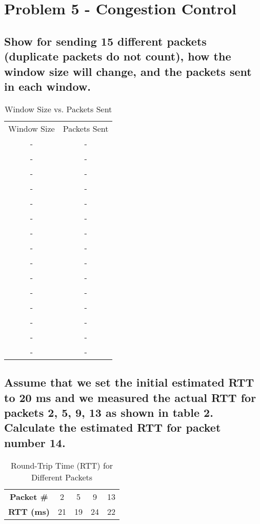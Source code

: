 \documentclass{article}
\begin{document}
\section{Problem 5 - Congestion Control}

\subsection{Show for sending 15 different packets (duplicate packets do not count), how the
window size will change, and the packets sent in each window.}

	\begin{table}[h]
		\centering
		\begin{tabular}{cc}
			Window Size & Packets Sent \\
			- & - \\
			- & - \\
			- & - \\
			- & - \\
			- & - \\
			- & - \\
			- & - \\
			- & - \\
			- & - \\
			- & - \\
			- & - \\
			- & - \\
			- & - \\
			- & - \\
			- & - \\
		\end{tabular}
		\caption{Window Size vs. Packets Sent}
		\label{tab:window_packets}
	\end{table}

\subsection{Assume that we set the initial estimated RTT to 20 ms and we measured the
actual RTT for packets 2, 5, 9, 13 as shown in table 2. Calculate the estimated RTT for
packet number 14.}

\begin{table}[h]
    \centering
    \begin{tabular}{ccccc}
        \textbf{Packet \#} & 2  & 5  & 9  & 13 \\
        \textbf{RTT (ms)}  & 21 & 19 & 24 & 22 \\
    \end{tabular}
    \caption{Round-Trip Time (RTT) for Different Packets}
    \label{tab:rtt_data}
\end{table}
\end{document}
